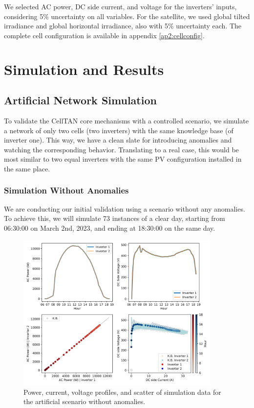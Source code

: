 We selected AC power, DC side current, and voltage for the inverters' inputs, considering 5\% uncertainty on all variables. For the satellite, we used global tilted irradiance and global horizontal irradiance, also with 5\% uncertainty each. The complete cell configuration is available in appendix \ref{ap2:cellconfig}.


\section{Simulation and Results} \label{subsec:results}

\subsection{Artificial Network Simulation}

To validate the CellTAN core mechanisms with a controlled scenario, we simulate a network of only two cells (two inverters) with the same knowledge base (of inverter one). This way, we have a clean slate for introducing anomalies and watching the corresponding behavior. Translating to a real case, this would be most similar to two equal inverters with the same PV configuration installed in the same place.

\subsubsection{Simulation Without Anomalies}  \label{subsubsec:simnoanom}

We are conducting our initial validation using a scenario without any anomalies. To achieve this, we will simulate 73 instances of a clear day, starting from 06:30:00 on March 2nd, 2023, and ending at 18:30:00 on the same day.

\begin{figure}[h!]
    \centering
    \includegraphics[width=0.9\textwidth]{figures/chapter5/results/artificial/40_test_clone_01-1.png}
    \caption{Power, current, voltage profiles, and scatter of simulation data for the artificial scenario without anomalies.}
    \label{fig:artificial_01_piv}
\end{figure}

